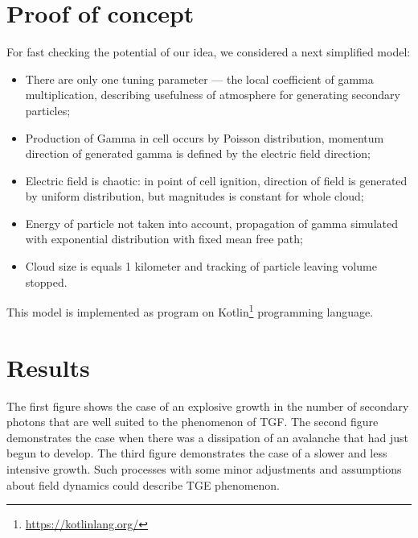\documentclass[utf8]{webofc}
\begin{document}
\section{Proof of concept}
For fast checking the potential of our idea, we considered a next simplified model:  
\begin{itemize}
	\item There are only one tuning parameter  --- the local coefficient of gamma multiplication, describing usefulness of atmosphere for generating secondary particles;
	\item Production of Gamma in cell occurs by Poisson distribution, momentum direction of generated gamma is defined by the electric field direction;
	\item Electric field is chaotic: in point of cell ignition, direction of field is generated by uniform distribution, but magnitudes is constant for whole cloud;
	\item Energy of particle not taken into account, propagation of gamma simulated with exponential distribution with fixed mean free path;
	\item Cloud size is equals 1 kilometer and tracking of particle leaving volume stopped. 
\end{itemize}
This model is implemented as program on Kotlin\footnote{\url{https://kotlinlang.org/}} programming language.
    
\section{Results}
The first figure shows the case of an explosive growth in the number of secondary photons that are well suited to the phenomenon of TGF.
The second figure demonstrates the case when there was a dissipation of an avalanche that had just begun to develop.
The third figure demonstrates the case of a slower and less intensive growth. Such processes with some minor adjustments and assumptions about field dynamics could describe TGE phenomenon.
    
\end{document}
